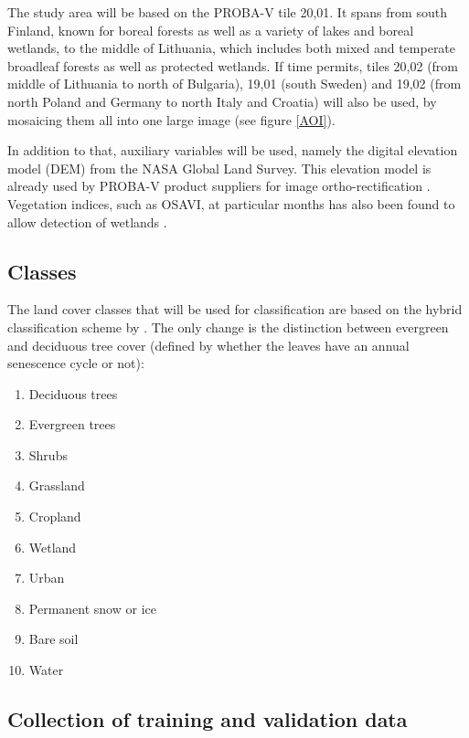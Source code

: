 \documentclass[a4paper,10pt]{article}
\begin{document}
The study area will be based on the PROBA-V tile 20,01. It spans from south Finland, known for boreal forests as well as a variety of lakes and boreal wetlands, to the middle of Lithuania, which includes both mixed and temperate broadleaf forests as well as protected wetlands. If time permits, tiles 20,02 (from middle of Lithuania to north of Bulgaria), 19,01 (south Sweden) and 19,02 (from north Poland and Germany to north Italy and Croatia) will also be used, by mosaicing them all into one large image (see figure \ref{AOI}).

In addition to that, auxiliary variables will be used, namely the digital elevation model (DEM) from the NASA Global Land Survey. This elevation model is already used by PROBA-V product suppliers for image ortho-rectification \cite{probavguide}. Vegetation indices, such as OSAVI, at particular months has also been found to allow detection of wetlands \cite{davranche2010wetland}.

\subsection{Classes}

The land cover classes that will be used for classification are based on the hybrid classification scheme by \cite{see2015hybrid}. The only change is the distinction between evergreen and deciduous tree cover (defined by whether the leaves have an annual senescence cycle or not):
\begin{enumerate}
 \item Deciduous trees
 \item Evergreen trees
 \item Shrubs
 \item Grassland
 \item Cropland
 \item Wetland
 \item Urban
 \item Permanent snow or ice
 \item Bare soil
 \item Water
\end{enumerate}

\subsection{Collection of training and validation data}
\end{document}
